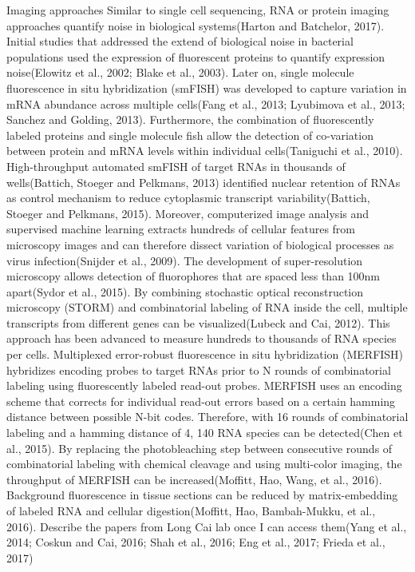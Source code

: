 Imaging approaches
Similar to single cell sequencing, RNA or protein imaging approaches quantify noise in biological systems(Harton and Batchelor, 2017). Initial studies that addressed the extend of biological noise in bacterial populations used the expression of fluorescent proteins to quantify expression noise(Elowitz et al., 2002; Blake et al., 2003). Later on, single molecule fluorescence in situ hybridization (smFISH) was developed to capture variation in mRNA abundance across multiple cells(Fang et al., 2013; Lyubimova et al., 2013; Sanchez and Golding, 2013). Furthermore, the combination of fluorescently labeled proteins and single molecule fish allow the detection of co-variation between protein and mRNA levels within individual cells(Taniguchi et al., 2010). High-throughput automated smFISH of target RNAs in thousands of wells(Battich, Stoeger and Pelkmans, 2013) identified nuclear retention of RNAs as control mechanism to reduce cytoplasmic transcript variability(Battich, Stoeger and Pelkmans, 2015). Moreover, computerized image analysis and supervised machine learning extracts hundreds of cellular features from microscopy images and can therefore dissect variation of biological processes as virus infection(Snijder et al., 2009).
The development of super-resolution microscopy allows detection of fluorophores that are spaced less than 100nm apart(Sydor et al., 2015). By combining stochastic optical reconstruction microscopy (STORM) and combinatorial labeling of RNA inside the cell, multiple transcripts from different genes can be visualized(Lubeck and Cai, 2012). This approach has been advanced to measure hundreds to thousands of RNA species per cells. Multiplexed error-robust fluorescence in situ hybridization (MERFISH) hybridizes encoding probes to target RNAs prior to N rounds of combinatorial labeling using fluorescently labeled read-out probes. MERFISH uses an encoding scheme that corrects for individual read-out errors based on a certain hamming distance between possible N-bit codes. Therefore, with 16 rounds of combinatorial labeling and a hamming distance of 4, 140 RNA species can be detected(Chen et al., 2015). By replacing the photobleaching step between consecutive rounds of combinatorial labeling with chemical cleavage and using multi-color imaging, the throughput of MERFISH can be increased(Moffitt, Hao, Wang, et al., 2016). Background fluorescence in tissue sections can be reduced by matrix-embedding of labeled RNA and cellular digestion(Moffitt, Hao, Bambah-Mukku, et al., 2016).
Describe the papers from Long Cai lab once I can access them(Yang et al., 2014; Coskun and Cai, 2016; Shah et al., 2016; Eng et al., 2017; Frieda et al., 2017)


